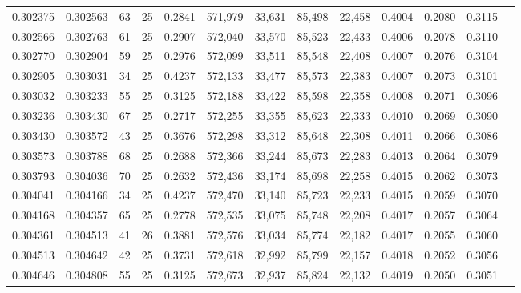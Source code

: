 \begin{tabular}{rrrrrrrrrrrrr}
0.302375 & 0.302563 &    63 &  25 &                                     0.2841 & 571,979 &  33,631 &  85,498 &  22,458 & 0.4004 & 0.2080 & 0.3115 \\
0.302566 & 0.302763 &    61 &  25 &                                     0.2907 & 572,040 &  33,570 &  85,523 &  22,433 & 0.4006 & 0.2078 & 0.3110 \\
0.302770 & 0.302904 &    59 &  25 &                                     0.2976 & 572,099 &  33,511 &  85,548 &  22,408 & 0.4007 & 0.2076 & 0.3104 \\
0.302905 & 0.303031 &    34 &  25 &                                     0.4237 & 572,133 &  33,477 &  85,573 &  22,383 & 0.4007 & 0.2073 & 0.3101 \\
0.303032 & 0.303233 &    55 &  25 &                                     0.3125 & 572,188 &  33,422 &  85,598 &  22,358 & 0.4008 & 0.2071 & 0.3096 \\
0.303236 & 0.303430 &    67 &  25 &                                     0.2717 & 572,255 &  33,355 &  85,623 &  22,333 & 0.4010 & 0.2069 & 0.3090 \\
0.303430 & 0.303572 &    43 &  25 &                                     0.3676 & 572,298 &  33,312 &  85,648 &  22,308 & 0.4011 & 0.2066 & 0.3086 \\
0.303573 & 0.303788 &    68 &  25 &                                     0.2688 & 572,366 &  33,244 &  85,673 &  22,283 & 0.4013 & 0.2064 & 0.3079 \\
0.303793 & 0.304036 &    70 &  25 &                                     0.2632 & 572,436 &  33,174 &  85,698 &  22,258 & 0.4015 & 0.2062 & 0.3073 \\
0.304041 & 0.304166 &    34 &  25 &                                     0.4237 & 572,470 &  33,140 &  85,723 &  22,233 & 0.4015 & 0.2059 & 0.3070 \\
0.304168 & 0.304357 &    65 &  25 &                                     0.2778 & 572,535 &  33,075 &  85,748 &  22,208 & 0.4017 & 0.2057 & 0.3064 \\
0.304361 & 0.304513 &    41 &  26 &                                     0.3881 & 572,576 &  33,034 &  85,774 &  22,182 & 0.4017 & 0.2055 & 0.3060 \\
0.304513 & 0.304642 &    42 &  25 &                                     0.3731 & 572,618 &  32,992 &  85,799 &  22,157 & 0.4018 & 0.2052 & 0.3056 \\
0.304646 & 0.304808 &    55 &  25 &                                     0.3125 & 572,673 &  32,937 &  85,824 &  22,132 & 0.4019 & 0.2050 & 0.3051 \\

\end{tabular}
